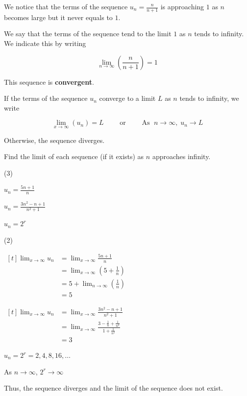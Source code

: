 \documentclass[11pt,a4paper]{book}
\begin{document}
We notice that the terms of the sequence ${\displaystyle u_{n}=\frac{n}{n+1}}$
is approaching $1$ as $n$ becomes large but it never equals to $1$.

We say that the terms of the sequence tend to the limit $1$ as $n$
tends to infinity. We indicate this by writing

\[
\lim_{n\to\infty}\left(\frac{n}{n+1}\right)=1
\]

This sequence is \textbf{convergent}.

\begin{tcolorbox}[colback=blue!5, colframe=black,boxrule=.4pt, sharpish corners]

If the terms of the sequence $u_{n}$ converge to a limit $L$ as
$n$ tends to infinity, we write

\[
\lim_{x\to\infty}\left(u_{n}\right)=L\qquad\text{ or }\qquad\text{As }\;n\to\infty,\;u_{n}\to L
\]

Otherwise, the sequence diverges.
\end{tcolorbox}

\begin{example}

Find the limit of each sequence (if it exists) as $n$ approaches
infinity.

\begin{tasks}[label=(\alph*),label-width=3.5ex](3)

\task  ${\displaystyle u_{n}=\frac{5n+1}{n}}$

\task  ${\displaystyle u_{n}=\frac{3n^{2}-n+1}{n^{2}+1}}$

\task  $u_{n}=2^{r}$

\end{tasks}

\Solution

\begin{tasks}[label=(\alph*),label-width=3.5ex](2)

\task
$
\begin{aligned}[t]
\lim_{x\to\infty}u_{n} & =\lim_{x\to\infty}\frac{5n+1}{n}\\
 & =\lim_{x\to\infty}\left(5+\frac{1}{n}\right)\\
 & =5+\lim_{n\to\infty}\left(\frac{1}{n}\right)\\
 & =5
\end{aligned}
$

\task
$
\begin{aligned}[t]
\lim_{x\to\infty}u_{n} & =\lim_{x\to\infty}\frac{3n^{2}-n+1}{n^{2}+1}\\
 & =\lim_{x\to\infty}\frac{3-\frac{1}{n}+\frac{1}{n^{2}}}{1+\frac{1}{n^{2}}}\\
 & =3
\end{aligned}
$

\task* $u_{n}=2^{r}=2,4,8,16,\ldots$

As $n\to\infty$, $2^{r}\to\infty$

Thus, the sequence diverges and the limit of the sequence does not
exist.

\end{tasks}

\end{example}
\end{document}
